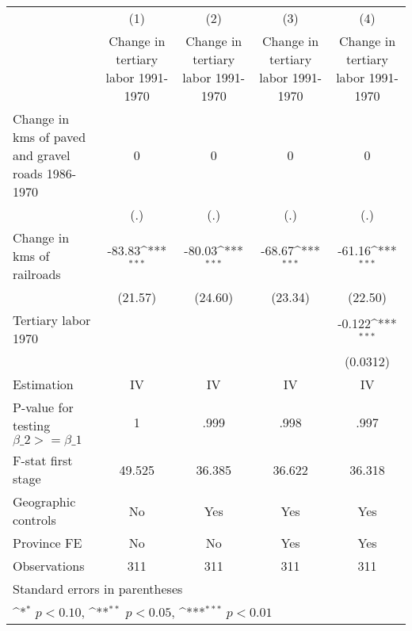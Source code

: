 {
\def\sym#1{\ifmmode^{#1}\else\(^{#1}\)\fi}
\begin{tabular}{l*{4}{c}}
\hline\hline
                    &\multicolumn{1}{c}{(1)}&\multicolumn{1}{c}{(2)}&\multicolumn{1}{c}{(3)}&\multicolumn{1}{c}{(4)}\\
                    &\multicolumn{1}{c}{Change in tertiary labor 1991-1970}&\multicolumn{1}{c}{Change in tertiary labor 1991-1970}&\multicolumn{1}{c}{Change in tertiary labor 1991-1970}&\multicolumn{1}{c}{Change in tertiary labor 1991-1970}\\
\hline
Change in kms of paved and gravel roads 1986-1970&           0         &           0         &           0         &           0         \\
                    &         (.)         &         (.)         &         (.)         &         (.)         \\
[1em]
Change in kms of railroads&      -83.83\sym{***}&      -80.03\sym{***}&      -68.67\sym{***}&      -61.16\sym{***}\\
                    &     (21.57)         &     (24.60)         &     (23.34)         &     (22.50)         \\
[1em]
Tertiary labor 1970 &                     &                     &                     &      -0.122\sym{***}\\
                    &                     &                     &                     &    (0.0312)         \\
\hline
Estimation          &          IV         &          IV         &          IV         &          IV         \\
P-value for testing $\beta\_2 >= \beta\_1$&           1         &        .999         &        .998         &        .997         \\
F-stat first stage  &      49.525         &      36.385         &      36.622         &      36.318         \\
Geographic controls &          No         &         Yes         &         Yes         &         Yes         \\
Province FE         &          No         &          No         &         Yes         &         Yes         \\
Observations        &         311         &         311         &         311         &         311         \\
\hline\hline
\multicolumn{5}{l}{\footnotesize Standard errors in parentheses}\\
\multicolumn{5}{l}{\footnotesize \sym{*} \(p<0.10\), \sym{**} \(p<0.05\), \sym{***} \(p<0.01\)}\\
\end{tabular}
}
